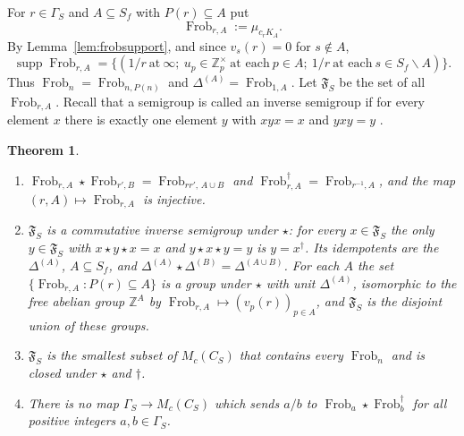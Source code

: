 \documentclass[11pt]{amsart}
\newtheorem{theorem}{Theorem}[section]
\theoremstyle{definition}
\newcommand{\Z}{\mathbb Z}
\newcommand{\Frob}{\operatorname{Frob}}
\newcommand{\supp}{\operatorname{supp}}
\begin{document}
For $r\in\Gamma_S$ and $A\subseteq S_f$ with $P(r)\subseteq A$ put
\begin{equation}\label{eq:gradedfrob}
  \Frob_{r,A}:=\mu_{c_rK_A}.
\end{equation}
By Lemma~\ref{lem:frobsupport}, and since $v_s(r)=0$ for $s\notin A$,
\[
  \supp\Frob_{r,A}=\bigl\{(1/r\ \text{at}\ \infty;\ u_p\in\Z_p^\times\
  \text{at each}\ p\in A;\ 1/r\ \text{at each}\ s\in S_f\smallsetminus A)
  \bigr\}.
\]
Thus $\Frob_n=\Frob_{n,P(n)}$ and $\Delta^{(A)}=\Frob_{1,A}$. Let
$\mathfrak F_S$ be the set of all $\Frob_{r,A}$. Recall that a semigroup is
called an inverse semigroup if for every element $x$ there is exactly one
element $y$ with $xyx=x$ and $yxy=y$ \cite{Lawson}.

\begin{theorem}\label{thm:invsemigroup}
\begin{enumerate}
\item[(i)] $\Frob_{r,A}\star\Frob_{r',B}=\Frob_{rr',\,A\cup B}$ and
$\Frob_{r,A}^\dagger=\Frob_{r^{-1},A}$, and the map
$(r,A)\mapsto\Frob_{r,A}$ is injective.
\item[(ii)] $\mathfrak F_S$ is a commutative inverse semigroup under
$\star$: for every $x\in\mathfrak F_S$ the only $y\in\mathfrak F_S$ with
$x\star y\star x=x$ and $y\star x\star y=y$ is $y=x^\dagger$. Its
idempotents are the $\Delta^{(A)}$, $A\subseteq S_f$, and
$\Delta^{(A)}\star\Delta^{(B)}=\Delta^{(A\cup B)}$. For each $A$ the set
$\{\Frob_{r,A}:P(r)\subseteq A\}$ is a group under $\star$ with unit
$\Delta^{(A)}$, isomorphic to the free abelian group $\Z^A$ by
$\Frob_{r,A}\mapsto(v_p(r))_{p\in A}$, and $\mathfrak F_S$ is the disjoint
union of these groups.
\item[(iii)] $\mathfrak F_S$ is the smallest subset of $M_c(C_S)$ that
contains every $\Frob_n$ and is closed under $\star$ and $\dagger$.
\item[(iv)] There is no map $\Gamma_S\to M_c(C_S)$ which sends $a/b$ to
$\Frob_a\star\Frob_b^\dagger$ for all positive integers $a,b\in\Gamma_S$.
\end{enumerate}
\end{theorem}
\end{document}

